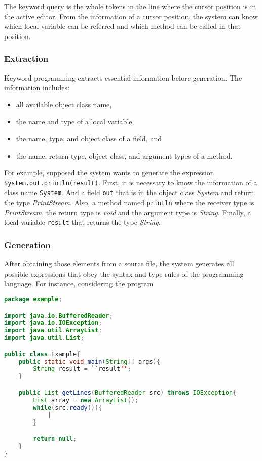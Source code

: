 \documentclass[PRO,english]{ipsj}
\begin{document}
The keyword query is the whole tokens in the line where the cursor position is in the active editor. From the information of a cursor position, the system can know which local variable can be referred and which method can be called in that position.

\subsubsection{Extraction}
Keyword programming extracts essential information before generation. The information includes:
\begin{itemize}
\item all available object class name,
\item the name and type of a local variable,
\item the name, type, and object class of a field, and
\item the name, return type, object class, and argument types of a method.
\end{itemize}

For example, supposed the system wants to generate the expression \texttt{System.out.println(result)}. First, it is necessary to know the information of a class name \texttt{System}. And a field \texttt{out} that is in the object class \textit{System} and return the type \textit{PrintStream}. Also, a method named \texttt{println} where the receiver type is \textit{PrintStream}, the return type is \textit{void} and the argument type is \textit{String}. Finally, a local variable \texttt{result} that returns the type \textit{String}.

\subsubsection{Generation}
After obtaining those elements from a source file, the system generates all possible expressions that obey the syntax and type rules of the programming language. For instance, considering the program

\begin{lstlisting}[language=Java]
package example;

import java.io.BufferedReader;
import java.io.IOException;
import java.util.ArrayList;
import java.util.List;

public class Example{
	public static void main(String[] args){
	    String result = ``result'';
	}

	public List getLines(BufferedReader src) throws IOException{
	    List array = new ArrayList();
	    while(src.ready()){
	        |
	    }

	    return null;
	}
}
\end{lstlisting}
\end{document}
